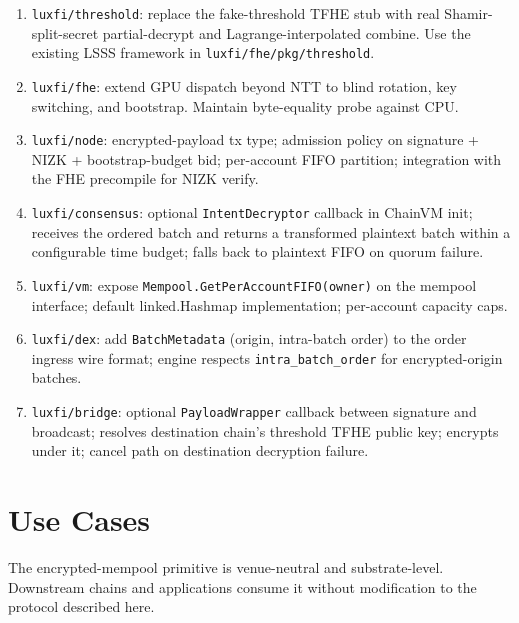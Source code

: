 \documentclass[11pt,a4paper]{article}
\begin{document}
\begin{enumerate}[label=\textbf{E\arabic*}]
\item \texttt{luxfi/threshold}: replace the fake-threshold TFHE
  stub with real Shamir-split-secret partial-decrypt and
  Lagrange-interpolated combine. Use the existing LSSS framework
  in \texttt{luxfi/fhe/pkg/threshold}.
\item \texttt{luxfi/fhe}: extend GPU dispatch beyond NTT to
  blind rotation, key switching, and bootstrap. Maintain
  byte-equality probe against CPU.
\item \texttt{luxfi/node}: encrypted-payload tx type; admission
  policy on signature + NIZK + bootstrap-budget bid; per-account
  FIFO partition; integration with the FHE precompile for NIZK
  verify.
\item \texttt{luxfi/consensus}: optional
  \texttt{IntentDecryptor} callback in ChainVM init; receives the
  ordered batch and returns a transformed plaintext batch within
  a configurable time budget; falls back to plaintext FIFO on
  quorum failure.
\item \texttt{luxfi/vm}: expose
  \texttt{Mempool.GetPerAccountFIFO(owner)} on the mempool
  interface; default linked.Hashmap implementation; per-account
  capacity caps.
\item \texttt{luxfi/dex}: add \texttt{BatchMetadata} (origin,
  intra-batch order) to the order ingress wire format; engine
  respects \texttt{intra\_batch\_order} for encrypted-origin
  batches.
\item \texttt{luxfi/bridge}: optional \texttt{PayloadWrapper}
  callback between signature and broadcast; resolves destination
  chain's threshold TFHE public key; encrypts under it; cancel
  path on destination decryption failure.
\end{enumerate}

\section{Use Cases}

The encrypted-mempool primitive is venue-neutral and substrate-level.
Downstream chains and applications consume it without modification
to the protocol described here.
\end{document}
